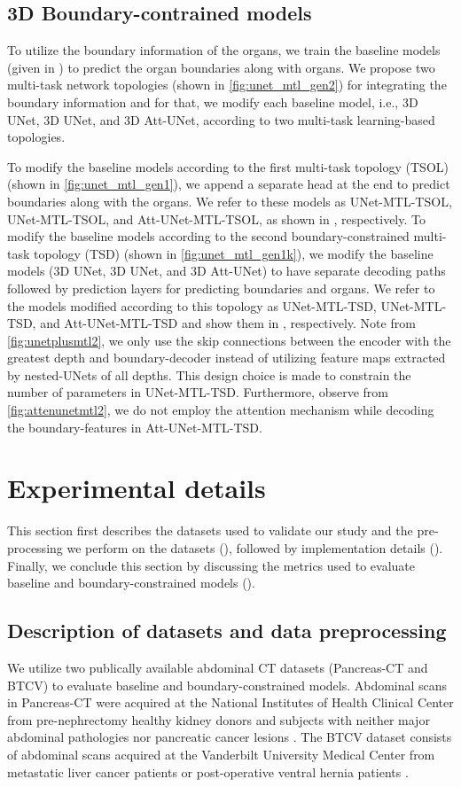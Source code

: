\documentclass[final,5p,times,twocolumn]{elsarticle}
\begin{document}
\subsection{3D Boundary-contrained models}\label{sec:bound}
To utilize the boundary information of the organs, we train the baseline models (given in ) to predict the organ boundaries along with organs. We propose two multi-task network topologies (shown in \autoref{fig:unet_mtl_gen2}) for integrating the boundary information and for that, we modify each baseline model, i.e., 3D UNet, 3D UNet, and 3D Att-UNet, according to two multi-task learning-based topologies. 

To modify the baseline models according to the first multi-task topology (TSOL) (shown in \autoref{fig:unet_mtl_gen1}), we append a separate head at the end to predict boundaries along with the organs. We refer to these models as UNet-MTL-TSOL, UNet-MTL-TSOL, and Att-UNet-MTL-TSOL, as shown in , respectively. To modify the baseline models according to the second boundary-constrained multi-task topology (TSD) (shown in \autoref{fig:unet_mtl_gen1k}), we modify the baseline models (3D UNet, 3D UNet, and 3D Att-UNet) to have separate decoding paths followed by prediction layers for predicting boundaries and organs. We refer to the models modified according to this topology as UNet-MTL-TSD, UNet-MTL-TSD, and Att-UNet-MTL-TSD and show them in , respectively. Note from \autoref{fig:unetplusmtl2}, we only use the skip connections between the encoder with the greatest depth and boundary-decoder instead of utilizing feature maps extracted by nested-UNets of all depths. This design choice is made to constrain the number of parameters in UNet-MTL-TSD. Furthermore, observe from \autoref{fig:attenunetmtl2}, we do not employ the attention mechanism while decoding the boundary-features in Att-UNet-MTL-TSD.
\section{Experimental details}\label{sec:experiment}
This section first describes the datasets used to validate our study and the pre-processing we perform on the datasets (), followed by implementation details (). Finally, we conclude this section by discussing the metrics used to evaluate baseline and boundary-constrained models ().
\subsection{Description of datasets and data preprocessing}\label{sec:data}
We utilize two publically available abdominal CT datasets (Pancreas-CT and BTCV) to evaluate baseline and boundary-constrained models. Abdominal scans in Pancreas-CT were acquired at the National Institutes of Health Clinical Center from pre-nephrectomy healthy kidney donors and subjects with neither major abdominal pathologies nor pancreatic cancer lesions \cite{Roth2016}. The BTCV dataset consists of abdominal scans acquired at the Vanderbilt University Medical Center from metastatic liver cancer patients or post-operative ventral hernia patients \cite{xu2016evaluation}.
\end{document}
